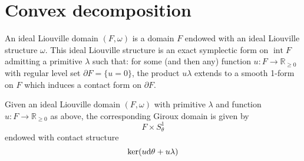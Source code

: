 \section*{Convex decomposition}

\begin{definition} \cite[Definition 1]{Giroux20}
An ideal Liouville domain
$(F, \omega)$ is a domain $F$ endowed with an ideal Liouville structure $\omega$. This
ideal Liouville structure is an exact symplectic form on $\operatorname{int} F$
admitting a primitive $\lambda$ such that: for some (and then any) function 
$u \colon F \to \mathbb R_{\geq 0}$  with regular level set $\partial F = \{u = 0\}$,
the product $u\lambda$ extends to a smooth 1-form on $F$ which 
induces a contact form on $\partial F$.
\end{definition}

\begin{definition}\cite[Section 5.3]{MNW13}\label{def:giroux_domain}
    Given an ideal Liouville domain $(F, \omega)$ with primitive $\lambda$
    and function $u \colon F \to \mathbb R_{\geq 0}$ as above,
    the corresponding Giroux domain is given by
    \[
        F \times S^1_\theta
    \]
    endowed with contact structure
    \[
        \ker(u \mathrm{d} \theta + u \lambda)
    \]
\end{definition}


